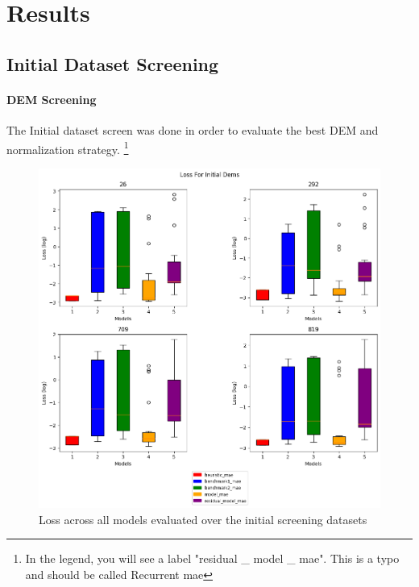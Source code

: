 
\chapter{Results} %
\label{Chapter5} %

\section{Initial Dataset Screening}
\subsubsection*{DEM Screening}
The Initial dataset screen was done in order to evaluate the best DEM and normalization strategy. \footnote{In the legend, you will see a label "residual \_ model \_ mae". This is a typo and should be called Recurrent mae}

\begin{figure}[htbp]
	\centering
	\includegraphics[width=0.9\linewidth, height=0.7\linewidth]{"Figures/Results/Initial screening/DEM screening plots/Box_Plot"}
	\caption[Loss over all DEMs]{Loss across all models evaluated over the initial screening datasets}
	\label{fig:dem-screening}
\end{figure}

